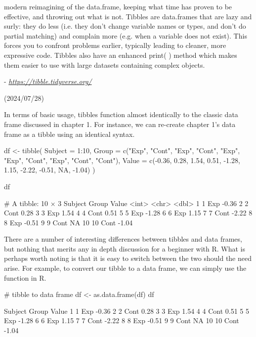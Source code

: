 \begin{displayquote}
\headingfont
modern reimagining of the data.frame, keeping what time has proven to be effective, and throwing out what is not. Tibbles are data.frames that are lazy and surly: they do less (i.e. they don’t change variable names or types, and don’t do partial matching) and complain more (e.g. when a variable does not exist). This forces you to confront problems earlier, typically leading to cleaner, more expressive code. Tibbles also have an enhanced print( ) method which makes them easier to use with large datasets containing complex objects.

- \textit{\url{https://tibble.tidyverse.org/}}

\vspace{-1em}
(2024/07/28)

\end{displayquote}

In terms of basic usage, tibbles function almost identically to the classic data frame discussed in chapter 1. For instance, we can re-create chapter 1's data frame as a tibble using an identical syntax.

\begin{inR}
df <- tibble(
  Subject = 1:10,
  Group = c("Exp", "Cont", "Exp", "Cont", "Exp", "Exp",
            "Cont", "Exp", "Cont", "Cont"),
  Value = c(-0.36,  0.28,  1.54,  0.51, -1.28,  1.15,
            -2.22, -0.51,  NA, -1.04)
)

df
\end{inR}

\begin{outR}
# A tibble: 10 × 3
   Subject Group Value
     <int> <chr> <dbl>
 1       1 Exp   -0.36
 2       2 Cont   0.28
 3       3 Exp    1.54
 4       4 Cont   0.51
 5       5 Exp   -1.28
 6       6 Exp    1.15
 7       7 Cont  -2.22
 8       8 Exp   -0.51
 9       9 Cont  NA   
10      10 Cont  -1.04
\end{outR}

\noindent
There are a number of interesting differences between tibbles and data frames, but nothing that merits any in depth discussion for a beginner with R. What is perhaps worth noting is that it is easy to switch between the two should the need arise. For example, to convert our tibble  to a data frame, we can simply use the  function in R.

\begin{inR}
# tibble to data frame
df <- as.data.frame(df)
df
\end{inR}
\begin{outR}
   Subject Group Value
1        1   Exp -0.36
2        2  Cont  0.28
3        3   Exp  1.54
4        4  Cont  0.51
5        5   Exp -1.28
6        6   Exp  1.15
7        7  Cont -2.22
8        8   Exp -0.51
9        9  Cont    NA
10      10  Cont -1.04
\end{outR}

